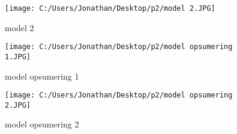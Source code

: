 \begin{figure}[h] 
	\centering
	\texttt{[image: C:/Users/Jonathan/Desktop/p2/model 2.JPG]}
	\caption{model 2}
	\label{fig:j06}
\end{figure}

\begin{figure}[h] 
	\centering
	\texttt{[image: C:/Users/Jonathan/Desktop/p2/model opsumering 1.JPG]}
	\caption{model opsumering 1}
	\label{fig:j06}
\end{figure}

\begin{figure}[h] 
	\centering
	\texttt{[image: C:/Users/Jonathan/Desktop/p2/model opsumering 2.JPG]}
	\caption{model opsumering 2}
	\label{fig:j06}
\end{figure}

